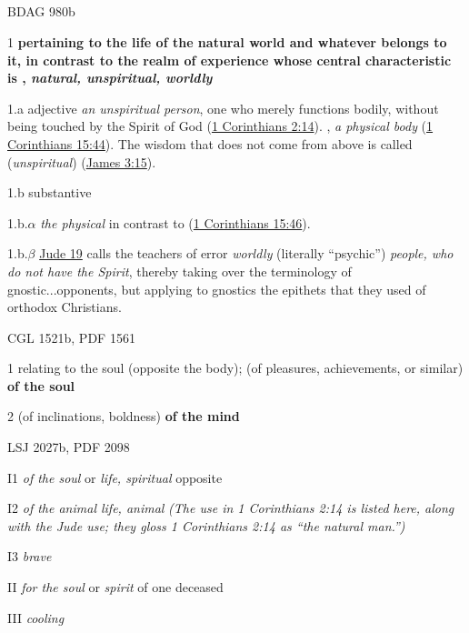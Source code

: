 			\subparagraph{\texorpdfstring{}{}}
				\label{PSUCHIKOS}
			
				\begin{compactdesc}
					\item[BDAG 980b] \textbf{}
						\begin{compactitem}
							\item[1] \textbf{pertaining to the life of the natural world and whatever belongs to it, in contrast to the realm of experience whose central characteristic is , \textit{natural, unspiritual, worldly}}
							\item[1.a] adjective  \textit{an unspiritual person}, one who merely functions bodily, without being touched by the Spirit of God (\hyperref[1CORINTHIANS-2-14]{1 Corinthians 2:14}). , \textit{a physical body} (\hyperref[1CORINTHIANS-15-44]{1 Corinthians 15:44}). The wisdom that does not come from above is called  (\textit{unspiritual}) (\hyperref[JAMES-3-15]{James 3:15}).
							\item[1.b] substantive
							\item[1.b.$\alpha$]  \textit{the physical} in contrast to  (\hyperref[1CORINTHIANS-15-46]{1 Corinthians 15:46}).
							\item[1.b.$\beta$] \hyperref[JUDE-1-19]{Jude 19} calls the teachers of error  \textit{worldly} (literally ``psychic'') \textit{people, who do not have the Spirit}, thereby taking over the terminology of gnostic...opponents, but applying to gnostics the epithets that they used of orthodox Christians.
						\end{compactitem}
					\item[CGL 1521b, PDF 1561] \textbf{}
						\begin{compactitem}
							\item[1] relating to the soul (opposite the body); (of pleasures, achievements, or similar) \textbf{of the soul}
							\item[2] (of inclinations, boldness) \textbf{of the mind}
						\end{compactitem}
					\item[LSJ 2027b, PDF 2098] \textbf{}
						\begin{compactitem}
							\item[I1] \textit{of the soul} or \textit{life, spiritual} opposite \gr{σωματικός}
							\item[I2] \textit{of the animal life, animal} \textit{(The use in 1 Corinthians 2:14 is listed here, along with the Jude use; they gloss 1 Corinthians 2:14 as ``the \textit{natural} man.'')}
							\item[I3] \textit{brave}
							\item[II] \textit{for the soul} or \textit{spirit} of one deceased
							\item[III] \textit{cooling}
						\end{compactitem}
				\end{compactdesc}
				
